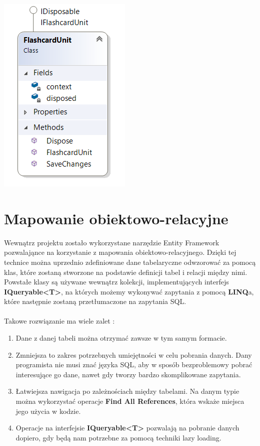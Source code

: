 \begin{center}
	\includegraphics{images/UnitOfWork.png}
\end{center}

\section{Mapowanie obiektowo-relacyjne}

Wewnątrz projektu zostało wykorzystane narzędzie Entity Framework pozwalająnce na korzystanie z mapowania obiektowo-relacyjnego. Dzięki tej technice można uprzednio zdefiniowane dane tabelaryczne odwzorować za pomocą klas, które zostaną stworzone na podstawie definicji tabel i relacji między nimi. Powstałe klasy są używane wewnątrz kolekcji, implementujących interfejs \textbf{IQueryable<T>}, na których możemy wykonywać zapytania z pomocą \textbf{LINQ}a, które następnie zostaną przetłumaczone na zapytania SQL.
\\ \\
Takowe rozwiązanie ma wiele zalet :
\begin{enumerate}
	\item Dane z danej tabeli można otrzymać zawsze w tym samym formacie.
	\item Zmniejsza to zakres potrzebnych umiejętności w celu pobrania danych. Dany programista nie musi znać języka SQL, aby w sposób bezproblemowy pobrać interesujące go dane, nawet gdy tworzy bardzo skomplikowane zapytania.
	\item Łatwiejsza nawigacja po zależnościach między tabelami. Na danym typie można wykorzystać operacje \textbf{Find All References}, która wskaże miejsca jego użycia w kodzie.
	\item Operacje na interfejsie \textbf{IQueryable<T>} pozwalają na pobranie danych dopiero, gdy będą nam potrzebne za pomocą techniki lazy loading.
\end{enumerate}

